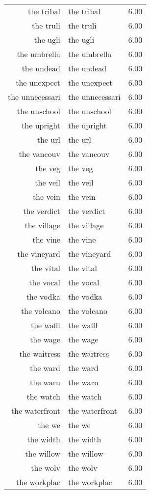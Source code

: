 \begin{table}[ht]
\begin{tabular}{rlr}
  the tribal & the tribal & 6.00 \\ 
  the truli & the truli & 6.00 \\ 
  the ugli & the ugli & 6.00 \\ 
  the umbrella & the umbrella & 6.00 \\ 
  the undead & the undead & 6.00 \\ 
  the unexpect & the unexpect & 6.00 \\ 
  the unnecessari & the unnecessari & 6.00 \\ 
  the unschool & the unschool & 6.00 \\ 
  the upright & the upright & 6.00 \\ 
  the url & the url & 6.00 \\ 
  the vancouv & the vancouv & 6.00 \\ 
  the veg & the veg & 6.00 \\ 
  the veil & the veil & 6.00 \\ 
  the vein & the vein & 6.00 \\ 
  the verdict & the verdict & 6.00 \\ 
  the village & the village & 6.00 \\ 
  the vine & the vine & 6.00 \\ 
  the vineyard & the vineyard & 6.00 \\ 
  the vital & the vital & 6.00 \\ 
  the vocal & the vocal & 6.00 \\ 
  the vodka & the vodka & 6.00 \\ 
  the volcano & the volcano & 6.00 \\ 
  the waffl & the waffl & 6.00 \\ 
  the wage & the wage & 6.00 \\ 
  the waitress & the waitress & 6.00 \\ 
  the ward & the ward & 6.00 \\ 
  the warn & the warn & 6.00 \\ 
  the watch & the watch & 6.00 \\ 
  the waterfront & the waterfront & 6.00 \\ 
  the we & the we & 6.00 \\ 
  the width & the width & 6.00 \\ 
  the willow & the willow & 6.00 \\ 
  the wolv & the wolv & 6.00 \\ 
  the workplac & the workplac & 6.00 \\ 

\end{tabular}
\end{table}

